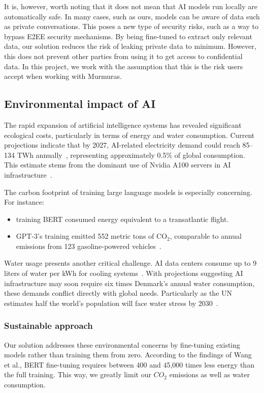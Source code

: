 \documentclass[licencjacka,en]{pracamgr}
\begin{document}
It is, however, worth noting that it does not mean that AI models run locally are automatically safe. In many cases, such as ours, models can be aware of data such as private conversations. This poses a new type of security risks, such as a way to bypass E2EE security mechanisms\cite{E2EE}. By being fine-tuned to extract only relevant data, our solution reduces the risk of leaking private data to minimum. However, this does not prevent other parties from using it to get access to confidential data. In this project, we work with the assumption that this is the risk users accept when working with Murmuras.

\subsection{Environmental impact of AI}
The rapid expansion of artificial intelligence systems has revealed significant ecological costs, particularly in terms of energy and water consumption. Current projections indicate that by 2027, AI-related electricity demand could reach 85--134 TWh annually~\cite{this_study}, representing approximately 0.5\% of global consumption. This estimate stems from the dominant use of Nvidia A100 servers in AI infrastructure~\cite{nyt_el}.

The carbon footprint of training large language models is especially concerning. For instance:
\begin{itemize}
    \item training BERT consumed energy equivalent to a transatlantic flight.
    \item GPT-3's training emitted 552 metric tons of CO$_2$, comparable to annual emissions from 123 gasoline-powered vehicles~\cite{sci_am_co2}.
\end{itemize}

Water usage presents another critical challenge. AI data centers consume up to 9 liters of water per kWh for cooling systems~\cite{first}. With projections suggesting AI infrastructure may soon require six times Denmark's annual water consumption, these demands conflict directly with global needs. Particularly as the UN estimates half the world's population will face water stress by 2030~\cite{water_scarcity}.

\subsubsection{Sustainable approach}
Our solution addresses these environmental concerns by fine-tuning existing models rather than training them from zero. According to the findings of Wang et al., BERT fine-tuning requires between 400 and 45,000 times less energy than the full training. This way, we greatly limit our $CO_2$ emissions as well as water consumption.
\end{document}
